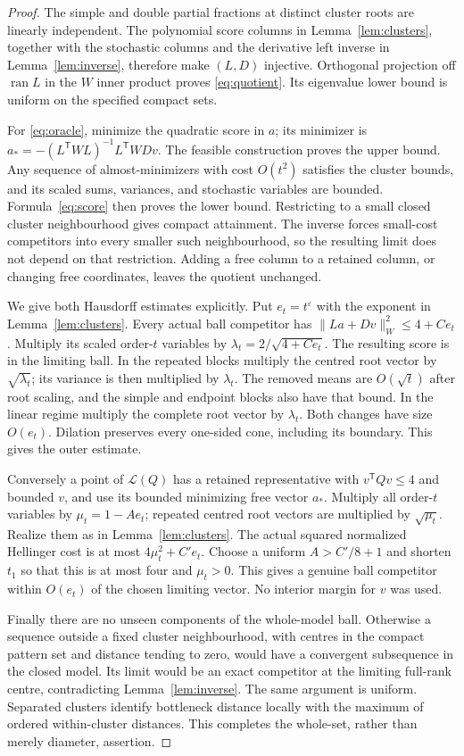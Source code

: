 \documentclass[11pt,reqno]{amsart}
\numberwithin{equation}{section}
\theoremstyle{definition}
\theoremstyle{remark}
\newcommand{\ran}{\operatorname{ran}}
\newcommand{\cL}{\mathcal L}
\newcommand{\eps}{\varepsilon}
\begin{document}
\begin{proof}
The simple and double partial fractions at distinct cluster roots are linearly independent. The polynomial score columns in Lemma~\ref{lem:clusters}, together with the stochastic columns and the derivative left inverse in Lemma~\ref{lem:inverse}, therefore make $(L,D)$ injective. Orthogonal projection off $\ran L$ in the $W$ inner product proves \eqref{eq:quotient}. Its eigenvalue lower bound is uniform on the specified compact sets.

For \eqref{eq:oracle}, minimize the quadratic score in $a$; its minimizer is
$a_* =-(L^{\mathsf T}WL)^{-1}L^{\mathsf T}WDv$. The feasible construction proves the upper bound. Any sequence of almost-minimizers with cost $O(t^2)$ satisfies the cluster bounds, and its scaled sums, variances, and stochastic variables are bounded. Formula~\eqref{eq:score} then proves the lower bound. Restricting to a small closed cluster neighbourhood gives compact attainment. The inverse forces small-cost competitors into every smaller such neighbourhood, so the resulting limit does not depend on that restriction. Adding a free column to a retained column, or changing free coordinates, leaves the quotient unchanged.

We give both Hausdorff estimates explicitly. Put $e_t=t^{\eps}$ with the exponent in Lemma~\ref{lem:clusters}. Every actual ball competitor has
$\|La+Dv\|_W^2\le4+C e_t$. Multiply its scaled order-$t$ variables by
$\lambda_t=2/\sqrt{4+C e_t}$. The resulting score is in the limiting ball. In the repeated blocks multiply the centred root vector by $\sqrt{\lambda_t}$; its variance is then multiplied by $\lambda_t$. The removed means are $O(\sqrt t)$ after root scaling, and the simple and endpoint blocks also have that bound. In the linear regime multiply the complete root vector by $\lambda_t$. Both changes have size $O(e_t)$. Dilation preserves every one-sided cone, including its boundary. This gives the outer estimate.

Conversely a point of $\cL(Q)$ has a retained representative with $v^{\mathsf T}Qv\le4$ and bounded $v$, and use its bounded minimizing free vector $a_*$. Multiply all order-$t$ variables by $\mu_t=1-Ae_t$; repeated centred root vectors are multiplied by $\sqrt{\mu_t}$. Realize them as in Lemma~\ref{lem:clusters}. The actual squared normalized Hellinger cost is at most $4\mu_t^2+C'e_t$. Choose a uniform $A>C'/8+1$ and shorten $t_1$ so that this is at most four and $\mu_t>0$. This gives a genuine ball competitor within $O(e_t)$ of the chosen limiting vector. No interior margin for $v$ was used.

Finally there are no unseen components of the whole-model ball. Otherwise a sequence outside a fixed cluster neighbourhood, with centres in the compact pattern set and distance tending to zero, would have a convergent subsequence in the closed model. Its limit would be an exact competitor at the limiting full-rank centre, contradicting Lemma~\ref{lem:inverse}. The same argument is uniform. Separated clusters identify bottleneck distance locally with the maximum of ordered within-cluster distances. This completes the whole-set, rather than merely diameter, assertion.
\end{proof}
\end{document}
